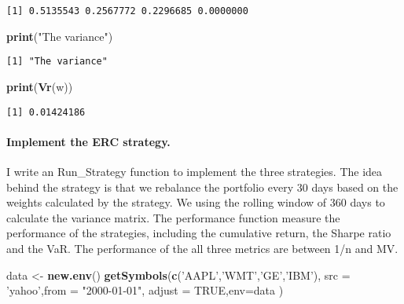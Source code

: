 \documentclass[]{article}
\newenvironment{Shaded}{\begin{snugshade}}{\end{snugshade}}
\newcommand{\KeywordTok}[1]{\textcolor[rgb]{0.13,0.29,0.53}{\textbf{{#1}}}}
\newcommand{\DataTypeTok}[1]{\textcolor[rgb]{0.13,0.29,0.53}{{#1}}}
\newcommand{\StringTok}[1]{\textcolor[rgb]{0.31,0.60,0.02}{{#1}}}
\newcommand{\OtherTok}[1]{\textcolor[rgb]{0.56,0.35,0.01}{{#1}}}
\newcommand{\NormalTok}[1]{{#1}}
\let\oldparagraph\paragraph
\renewcommand{\paragraph}[1]{\oldparagraph{#1}\mbox{}}
\begin{document}
\begin{verbatim}
[1] 0.5135543 0.2567772 0.2296685 0.0000000
\end{verbatim}

\begin{Shaded}
\begin{Highlighting}[]
\KeywordTok{print}\NormalTok{(}\StringTok{"The variance"}\NormalTok{)}
\end{Highlighting}
\end{Shaded}

\begin{verbatim}
[1] "The variance"
\end{verbatim}

\begin{Shaded}
\begin{Highlighting}[]
\KeywordTok{print}\NormalTok{(}\KeywordTok{Vr}\NormalTok{(w))}
\end{Highlighting}
\end{Shaded}

\begin{verbatim}
[1] 0.01424186
\end{verbatim}

\paragraph{Implement the ERC
strategy.}\label{implement-the-erc-strategy.}

I write an Run\_Strategy function to implement the three strategies. The
idea behind the strategy is that we rebalance the portfolio every 30
days based on the weights calculated by the strategy. We using the
rolling window of 360 days to calculate the variance matrix. The
performance function measure the performance of the strategies,
including the cumulative return, the Sharpe ratio and the VaR. The
performance of the all three metrics are between 1/n and MV.

\begin{Shaded}
\begin{Highlighting}[]
\NormalTok{data <-}\StringTok{ }\KeywordTok{new.env}\NormalTok{()}
\KeywordTok{getSymbols}\NormalTok{(}\KeywordTok{c}\NormalTok{(}\StringTok{'AAPL'}\NormalTok{,}\StringTok{'WMT'}\NormalTok{,}\StringTok{'GE'}\NormalTok{,}\StringTok{'IBM'}\NormalTok{), }\DataTypeTok{src =} \StringTok{'yahoo'}\NormalTok{,}\DataTypeTok{from =} \StringTok{"2000-01-01"}\NormalTok{, }\DataTypeTok{adjust =}  \OtherTok{TRUE}\NormalTok{,}\DataTypeTok{env=}\NormalTok{data )}
\end{Highlighting}
\end{Shaded}
\end{document}
